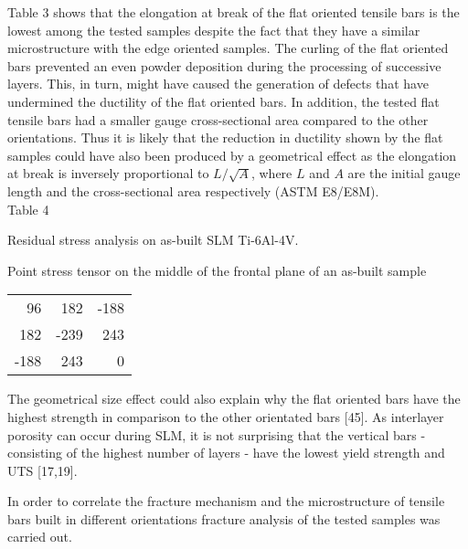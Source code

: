 \documentclass[10pt]{article}
\begin{document}
Table 3 shows that the elongation at break of the flat oriented tensile bars is the lowest among the tested samples despite the fact that they have a similar microstructure with the edge oriented samples. The curling of the flat oriented bars prevented an even powder deposition during the processing of successive layers. This, in turn, might have caused the generation of defects that have undermined the ductility of the flat oriented bars. In addition, the tested flat tensile bars had a smaller gauge cross-sectional area compared to the other orientations. Thus it is likely that the reduction in ductility shown by the flat samples could have also been produced by a geometrical effect as the elongation at break is inversely proportional to $L / \sqrt{A}$, where $L$ and $A$ are the initial gauge length and the cross-sectional area respectively (ASTM E8/E8M).\\
Table 4

Residual stress analysis on as-built SLM Ti-6Al-4V.

Point stress tensor on the middle of the frontal plane of an as-built sample

\begin{center}
\begin{tabular}{rrr}
\hline
96 & 182 & -188 \\
182 & -239 & 243 \\
-188 & 243 & 0 \\
\hline
\end{tabular}
\end{center}

The geometrical size effect could also explain why the flat oriented bars have the highest strength in comparison to the other orientated bars [45]. As interlayer porosity can occur during SLM, it is not surprising that the vertical bars - consisting of the highest number of layers - have the lowest yield strength and UTS [17,19].

In order to correlate the fracture mechanism and the microstructure of tensile bars built in different orientations fracture analysis of the tested samples was carried out.
\end{document}
